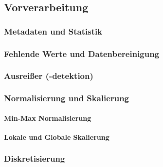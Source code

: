         \subsection{Vorverarbeitung} %

            \subsubsection{Metadaten und Statistik} %

            \subsubsection{Fehlende Werte und Datenbereinigung} %

            \subsubsection{Ausreißer (-detektion)} %

            \subsubsection{Normalisierung und Skalierung} %

                \paragraph{Min-Max Normalisierung} %

                \paragraph{Lokale und Globale Skalierung} %

            \subsubsection{Diskretisierung} %

